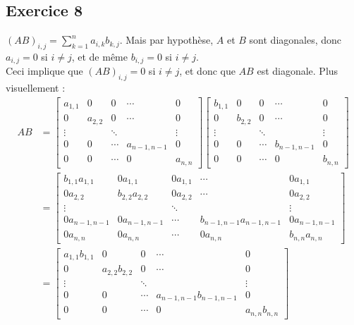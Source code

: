 \documentclass{article}
\begin{document}
\subsection*{Exercice 8}
\noindent $(AB)_{i,j}=\displaystyle\sum_{k=1}^{n}a_{i,k}b_{k,j}$. Mais par hypothèse, $A$ et $B$ sont diagonales, donc $a_{i,j} = 0$ si $i \neq j$, et de même $b_{i,j} = 0$ si $i \neq j$. \\
Ceci implique que $(AB)_{i,j} = 0$ si $i \neq j$, et donc que $AB$ est diagonale. Plus visuellement : 
\begin{align*}
AB &= \begin{bmatrix}
a_{1,1} & 0 & 0 & \cdots & 0\\
0 & a_{2,2} & 0 & \cdots & 0 \\
\vdots & &\ddots & & \vdots \\
0 & 0 & \cdots & a_{n-1, n-1} & 0\\
0 & 0 &\cdots& 0 & a_{n,n}
\end{bmatrix}
\begin{bmatrix}
b_{1,1} & 0 & 0 & \cdots & 0\\
0 & b_{2,2} & 0 & \cdots & 0 \\
\vdots & &\ddots & & \vdots \\
0 & 0 & \cdots & b_{n-1, n-1} & 0\\
0 & 0 &\cdots& 0 & b_{n,n}
\end{bmatrix}\\
&= \begin{bmatrix}
b_{1,1}a_{1,1} & 0a_{1,1} & 0a_{1,1} & \cdots & 0a_{1,1}\\
0a_{2,2} & b_{2,2}a_{2,2} & 0a_{2,2} & \cdots & 0a_{2,2} \\
\vdots & &\ddots & & \vdots \\
0a_{n-1, n-1} & 0a_{n-1, n-1} & \cdots & b_{n-1, n-1}a_{n-1, n-1} & 0a_{n-1, n-1}\\
0a_{n,n} & 0a_{n,n} &\cdots& 0a_{n,n} & b_{n,n}a_{n,n}
\end{bmatrix}\\
&= \begin{bmatrix}
a_{1,1}b_{1,1} & 0 & 0 & \cdots & 0\\
0 & a_{2,2}b_{2,2} & 0 & \cdots & 0 \\
\vdots & &\ddots & & \vdots \\
0 & 0 & \cdots & a_{n-1,n-1}b_{n-1, n-1} & 0\\
0 & 0 &\cdots& 0 & a_{n,n}b_{n,n}
\end{bmatrix}
\end{align*}
\end{document}
